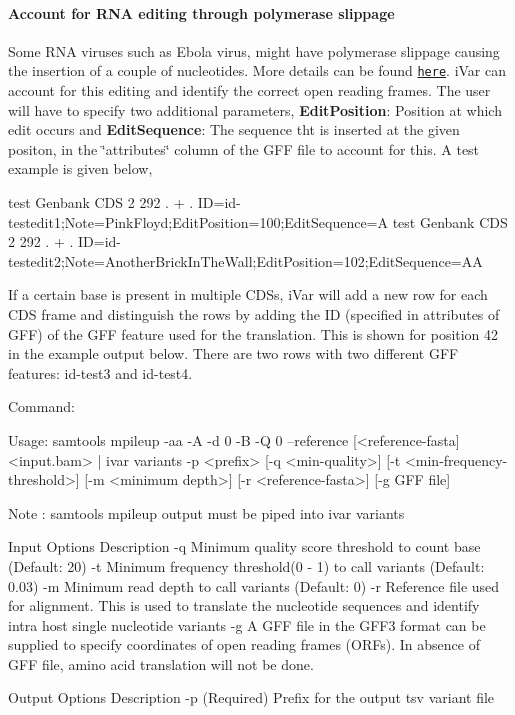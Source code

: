 \paragraph*{Account for R\+NA editing through polymerase slippage}

Some R\+NA viruses such as Ebola virus, might have polymerase slippage causing the insertion of a couple of nucleotides. More details can be found \href{https://viralzone.expasy.org/857?outline=all_by_protein}{\tt here}. i\+Var can account for this editing and identify the correct open reading frames. The user will have to specify two additional parameters, {\bfseries Edit\+Position}\+: Position at which edit occurs and {\bfseries Edit\+Sequence}\+: The sequence tht is inserted at the given positon, in the \char`\"{}attributes\char`\"{} column of the G\+FF file to account for this. A test example is given below,


\begin{DoxyCode}
test    Genbank CDS 2   292 .   +   .   ID=id-testedit1;Note=PinkFloyd;EditPosition=100;EditSequence=A
test    Genbank CDS 2   292 .   +   .  
       ID=id-testedit2;Note=AnotherBrickInTheWall;EditPosition=102;EditSequence=AA
\end{DoxyCode}


If a certain base is present in multiple C\+D\+Ss, i\+Var will add a new row for each C\+DS frame and distinguish the rows by adding the ID (specified in attributes of G\+FF) of the G\+FF feature used for the translation. This is shown for position 42 in the example output below. There are two rows with two different G\+FF features\+: id-\/test3 and id-\/test4.

Command\+:


\begin{DoxyCode}
Usage: samtools mpileup -aa -A -d 0 -B -Q 0 --reference [<reference-fasta] <input.bam> | ivar variants -p
       <prefix> [-q <min-quality>] [-t <min-frequency-threshold>] [-m <minimum depth>] [-r <reference-fasta>] [-g
       GFF file]

Note : samtools mpileup output must be piped into ivar variants

Input Options    Description
           -q    Minimum quality score threshold to count base (Default: 20)
           -t    Minimum frequency threshold(0 - 1) to call variants (Default: 0.03)
           -m    Minimum read depth to call variants (Default: 0)
           -r    Reference file used for alignment. This is used to translate the nucleotide sequences and
       identify intra host single nucleotide variants
           -g    A GFF file in the GFF3 format can be supplied to specify coordinates of open reading
       frames (ORFs). In absence of GFF file, amino acid translation will not be done.

Output Options   Description
           -p    (Required) Prefix for the output tsv variant file
\end{DoxyCode}


